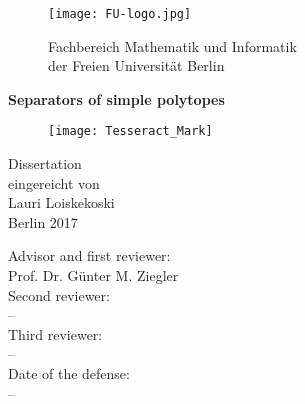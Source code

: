 \documentclass[a4paper,12pt]{book}
\theoremstyle{plain}
\theoremstyle{definition}
\begin{document}
\begin{titlepage}
\begin{center}
\begin{figure}[h]
\begin{minipage}{.35\textwidth}
\begin{center}
\texttt{[image: FU-logo.jpg]}
\end{center}
\end{minipage}
\begin{minipage}{.64\textwidth}
\large {Fachbereich Mathematik und Informatik\\
der Freien Universit\"at Berlin}
\end{minipage}
\end{figure}

\vspace{1.5cm}
\LARGE{\bf{
Separators of simple polytopes}}\\

\vspace{1cm}
\begin{figure}[h]
\begin{center}

\texttt{[image: Tesseract\_Mark]}

\end{center}
\end{figure}
\vspace{0.5cm}
\LARGE{
{Dissertation}\\}
\large
\vspace{1cm}
eingereicht von\\
Lauri Loiskekoski\\
\vspace{1.5cm}
Berlin 2017\\
\vspace{3cm}
\end{center}
\end{titlepage}

\cleardoublepage\thispagestyle{empty}

\null\vfill
\begin{center}
\large{Advisor and first reviewer:\\
Prof. Dr. Günter M. Ziegler}\\
\vspace{0.2cm}
Second reviewer:\\
--\\
\vspace{0.2cm}
Third reviewer:\\
--\\
\vspace{0.6cm}
Date of the defense:\\
--
\end{center}
\end{document}
